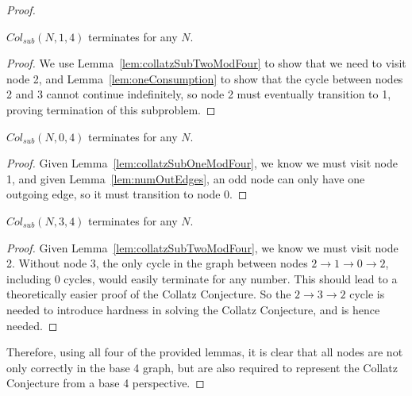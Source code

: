 \begin{proof}
\begin{lemma}
\label{lem:collatzSubOneModFour}
$Col_{sub}(N,1,4)$ terminates for any $N$.
\end{lemma}
\begin{proof}
We use Lemma~\ref{lem:collatzSubTwoModFour} to show that we need to visit node 2, and Lemma~\ref{lem:oneConsumption} to show that the cycle between nodes 2 and 3 cannot continue indefinitely, so node 2 must eventually transition to 1, proving termination of this subproblem.
\end{proof}
\begin{lemma}
\label{lem:collatzSubZeroModFour}
$Col_{sub}(N,0,4)$ terminates for any $N$.
\end{lemma}
\begin{proof}
Given Lemma~\ref{lem:collatzSubOneModFour}, we know we must visit node 1, and given Lemma~\ref{lem:numOutEdges}, an odd node can only have one outgoing edge, so it must transition to node 0.
\end{proof}
\begin{lemma}
\label{lem:collatzSubThreeModFour}
$Col_{sub}(N,3,4)$ terminates for any $N$.
\end{lemma}
\begin{proof}
Given Lemma~\ref{lem:collatzSubTwoModFour}, we know we must visit node 2. Without node 3, the only cycle in the graph between nodes $2 \rightarrow 1 \rightarrow 0 \rightarrow 2$, including 0 cycles, would easily terminate for any number. This should lead to a theoretically easier proof of the Collatz Conjecture. So the $2 \rightarrow 3 \rightarrow 2$ cycle is needed to introduce hardness in solving the Collatz Conjecture, and is hence needed.
\end{proof}
Therefore, using all four of the provided lemmas, it is clear that all nodes are not only correctly in the base 4 graph, but are also required to represent the Collatz Conjecture from a base 4 perspective.
\end{proof}
